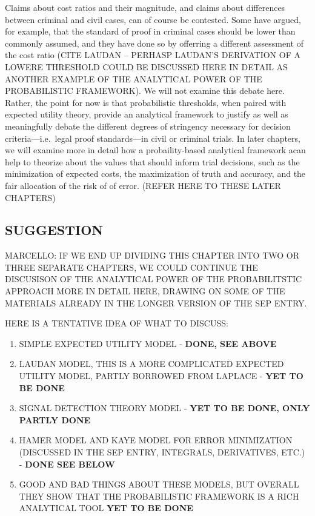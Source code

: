 \documentclass[10pt,dvipsnames,enabledeprecatedfontcommands]{scrartcl}
\begin{document}
\noindent Claims about cost ratios and their magnitude, and claims about
differences between criminal and civil cases, can of course be
contested. Some have argued, for example, that the standard of proof in
criminal cases should be lower than commonly assumed, and they have done
so by offerring a different assessment of the cost ratio (CITE LAUDAN --
PERHASP LAUDAN'S DERIVATION OF A LOWERE THRESHOLD COULD BE DISCUSSED
HERE IN DETAIL AS ANOTHER EXAMPLE OF THE ANALYTICAL POWER OF THE
PROBABILISTIC FRAMEWORK). We will not examine this debate here. Rather,
the point for now is that probabilistic thresholds, when paired with
expected utility theory, provide an analytical framework to justify as
well as meaningfully debate the different degrees of stringency
necessary for decision criteria---i.e.~legal proof standards---in civil
or criminal trials. In later chapters, we will examine more in detail
how a probaility-based analytical framework acan help to theorize about
the values that should inform trial decisions, such as the minimization
of expected costs, the maximization of truth and accuracy, and the fair
allocation of the risk of of error. (REFER HERE TO THESE LATER CHAPTERS)

\subsection{SUGGESTION}

MARCELLO: IF WE END UP DIVIDING THIS CHAPTER INTO TWO OR THREE SEPARATE
CHAPTERS, WE COULD CONTINUE THE DISCUSISON OF THE ANALYTICAL POWER OF
THE PROBABILITSTIC APPROACH MORE IN DETAIL HERE, DRAWING ON SOME OF THE
MATERIALS ALREADY IN THE LONGER VERSION OF THE SEP ENTRY.

HERE IS A TENTATIVE IDEA OF WHAT TO DISCUSS:

\begin{enumerate}
\def\labelenumi{(\arabic{enumi})}
\item
  SIMPLE EXPECTED UTILITY MODEL - \textbf{DONE, SEE ABOVE}
\item
  LAUDAN MODEL, THIS IS A MORE COMPLICATED EXPECTED UTILITY MODEL,
  PARTLY BORROWED FROM LAPLACE - \textbf{YET TO BE DONE}
\item
  SIGNAL DETECTION THEORY MODEL -
  \textbf{YET TO BE DONE, ONLY PARTLY DONE}
\item
  HAMER MODEL AND KAYE MODEL FOR ERROR MINIMIZATION (DISCUSSED IN THE
  SEP ENTRY, INTEGRALS, DERIVATIVES, ETC.) - \textbf{DONE SEE BELOW}
\item
  GOOD AND BAD THINGS ABOUT THESE MODELS, BUT OVERALL THEY SHOW THAT THE
  PROBABILISTIC FRAMEWORK IS A RICH ANALYTICAL TOOL
  \textbf{YET TO BE DONE}
\end{enumerate}
\end{document}
